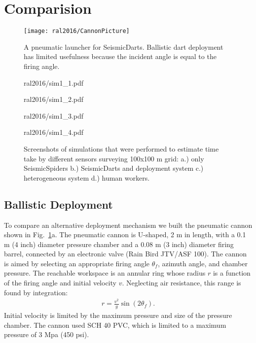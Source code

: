 \section[Comparision]{Comparision}


\begin{figure} \centering
	{\texttt{[image: ral2016/CannonPicture]}}
	\caption{
		A pneumatic launcher for SeismicDarts.
		Ballistic dart deployment has limited usefulness because the incident angle is equal to the firing angle.} 
	\label{fig:CannonPicture}
\end{figure}

\begin{figure*}[htb]
	\centering 
	\begin{overpic}[width =\figwid]{ral2016/sim1_1.pdf}
	\end{overpic}
	\begin{overpic}[width =\figwid]{ral2016/sim1_2.pdf}
	\end{overpic}
	\begin{overpic}[width =\figwid]{ral2016/sim1_3.pdf}
	\end{overpic}
	\begin{overpic}[width =\figwid]{ral2016/sim1_4.pdf}
	\end{overpic}
	\caption{
		Screenshots of simulations that were performed to estimate time take by different sensors surveying 100x100 m grid:
		a.) only SeismicSpiders
		b.) SeismicDarts and deployment system
		c.) heterogeneous system
		d.) human workers.
	\label{fig:Sim_overview}}
\end{figure*}

\subsection{Ballistic Deployment}
To compare an alternative deployment mechanism we built the pneumatic cannon shown in Fig.~\ref{fig:CannonPicture}a.
The pneumatic cannon is U-shaped,  2 m in length, with a 0.1 m (4 inch) diameter pressure chamber and a 0.08 m (3 inch) diameter firing barrel, connected by an electronic valve (Rain Bird JTV/ASF 100).
The cannon is aimed by selecting an appropriate firing angle $\theta_f$, azimuth angle, and chamber pressure.
The reachable workspace is an annular ring whose radius $r$ is a function of the firing angle and initial velocity $v$.
Neglecting air resistance, this range is found by integration:
\begin{align}
r = \frac{v^2}{g} \sin( 2 \theta_f ).
\end{align} 
Initial velocity is limited by the maximum pressure and size of the pressure chamber.
The cannon used  SCH 40 PVC, which is limited to a maximum pressure of 3 Mpa (450 psi).

